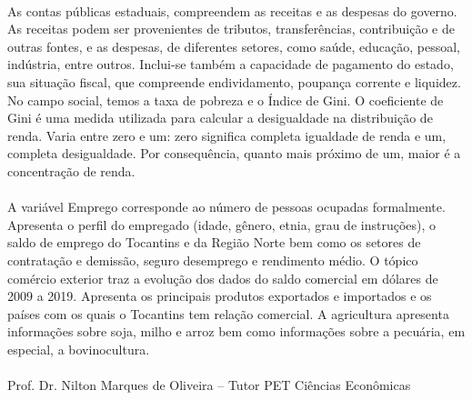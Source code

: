 \begin{center}
\begin{minipage}[t]{.7\linewidth}
		\paragraph{} As contas públicas estaduais, compreendem as receitas e as despesas do governo. As receitas podem ser provenientes de tributos, transferências, contribuição e de outras fontes, e as despesas, de diferentes setores, como saúde, educação, pessoal, indústria, entre outros. Inclui-se também a capacidade de pagamento do estado, sua situação fiscal, que compreende endividamento, poupança corrente e liquidez. No campo social, temos a taxa de pobreza e o Índice de Gini. O coeficiente de Gini é uma medida utilizada para calcular a desigualdade na distribuição de renda. Varia entre zero e um: zero significa completa igualdade de renda e um, completa desigualdade. Por consequência, quanto mais próximo de um, maior é a concentração de renda.

		\paragraph{} A variável Emprego corresponde ao número de pessoas ocupadas formalmente. Apresenta o perfil do empregado (idade, gênero, etnia, grau de instruções), o saldo de emprego do Tocantins e da Região Norte bem como os setores de contratação e demissão, seguro desemprego e rendimento médio. O tópico comércio exterior traz a evolução dos dados do saldo comercial em dólares de 2009 a 2019. Apresenta os principais produtos exportados e importados e os países com os quais    o Tocantins tem relação comercial. A agricultura apresenta informações sobre soja, milho e arroz bem como informações sobre a pecuária, em especial, a bovinocultura.
		\\
		\\
		Prof. Dr. Nilton Marques de Oliveira -- Tutor PET Ciências Econômicas
	\end{minipage}
\end{center}
\thispagestyle{empty}
